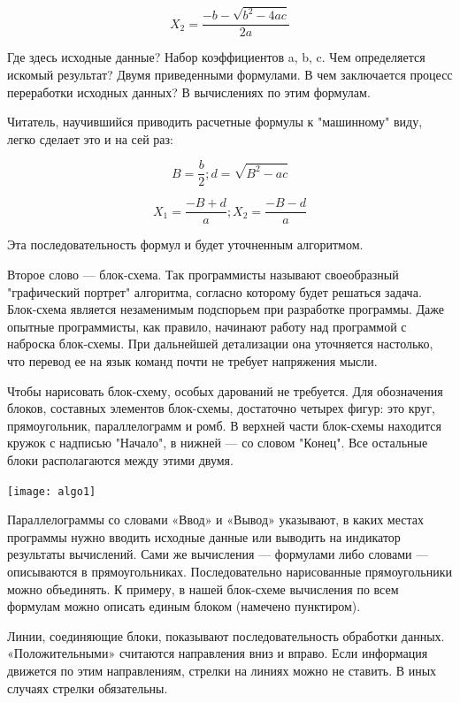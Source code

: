 \documentclass[11pt,a4paper,oneside]{article}
\begin{document}
\begin{equation}
X_{2}=\frac{-b-\sqrt{b^{2}-4ac}}{2a}
\end{equation}

Где здесь исходные данные? Набор коэффициентов a, b, c. Чем определяется искомый результат? Двумя приведенными формулами. В чем заключается процесс переработки исходных данных? В вычислениях по этим формулам.

Читатель, научившийся приводить расчетные формулы к "машинному" виду, легко сделает это и на сей раз:

\begin{equation}
B=\frac{b}{2} ; d=\sqrt{B^{2}-ac}
\end{equation}

\begin{equation}
X_{1}=\frac{-B+d}{a}; X_{2}=\frac{-B-d}{a}
\end{equation}

Эта последовательность формул и будет уточненным алгоритмом.

Второе слово — блок-схема. Так программисты называют своеобразный "графический портрет" алгоритма, согласно которому будет решаться задача. Блок-схема является незаменимым подспорьем при разработке программы. Даже опытные программисты, как правило, начинают работу над программой с наброска блок-схемы. При дальнейшей детализации она уточняется настолько, что перевод ее на язык команд почти не требует напряжения мысли.

Чтобы нарисовать блок-схему, особых дарований не требуется. Для обозначения блоков, составных элементов блок-схемы, достаточно четырех фигур: это круг, прямоугольник, параллелограмм и ромб. В верхней части блок-схемы находится кружок с надписью "Начало", в нижней — со словом "Конец". Все остальные блоки располагаются между этими двумя.

\texttt{[image: algo1]}

Параллелограммы со словами «Ввод» и «Вывод» указывают, в каких местах программы нужно вводить исходные данные или выводить на индикатор результаты вычислений. Сами же вычисления — формулами либо словами — описываются в прямоугольниках. Последовательно нарисованные прямоугольники можно объединять. К примеру, в нашей блок-схеме вычисления по всем формулам можно описать единым блоком (намечено пунктиром).

Линии, соединяющие блоки, показывают последовательность обработки данных. «Положительными» считаются направления вниз и вправо. Если информация движется по этим направлениям, стрелки на линиях можно не ставить. В иных случаях стрелки обязательны.
\end{document}
